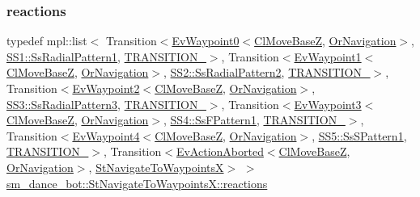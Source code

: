 \subsubsection{\texorpdfstring{reactions}{reactions}}
{\footnotesize\ttfamily typedef mpl\+::list$<$ Transition$<$\hyperlink{structcl__move__base__z_1_1EvWaypoint0}{Ev\+Waypoint0}$<$\hyperlink{classcl__move__base__z_1_1ClMoveBaseZ}{Cl\+Move\+BaseZ}, \hyperlink{classsm__dance__bot_1_1OrNavigation}{Or\+Navigation}$>$, \hyperlink{structsm__dance__bot_1_1SS1_1_1SsRadialPattern1}{S\+S1\+::\+Ss\+Radial\+Pattern1}, \hyperlink{structsm__dance__bot_1_1StNavigateToWaypointsX_1_1TRANSITION__1}{T\+R\+A\+N\+S\+I\+T\+I\+O\+N\+\_}$>$, Transition$<$\hyperlink{structcl__move__base__z_1_1EvWaypoint1}{Ev\+Waypoint1}$<$\hyperlink{classcl__move__base__z_1_1ClMoveBaseZ}{Cl\+Move\+BaseZ}, \hyperlink{classsm__dance__bot_1_1OrNavigation}{Or\+Navigation}$>$, \hyperlink{structsm__dance__bot_1_1SS2_1_1SsRadialPattern2}{S\+S2\+::\+Ss\+Radial\+Pattern2}, \hyperlink{structsm__dance__bot_1_1StNavigateToWaypointsX_1_1TRANSITION__2}{T\+R\+A\+N\+S\+I\+T\+I\+O\+N\+\_}$>$, Transition$<$\hyperlink{structcl__move__base__z_1_1EvWaypoint2}{Ev\+Waypoint2}$<$\hyperlink{classcl__move__base__z_1_1ClMoveBaseZ}{Cl\+Move\+BaseZ}, \hyperlink{classsm__dance__bot_1_1OrNavigation}{Or\+Navigation}$>$, \hyperlink{structsm__dance__bot_1_1SS3_1_1SsRadialPattern3}{S\+S3\+::\+Ss\+Radial\+Pattern3}, \hyperlink{structsm__dance__bot_1_1StNavigateToWaypointsX_1_1TRANSITION__3}{T\+R\+A\+N\+S\+I\+T\+I\+O\+N\+\_}$>$, Transition$<$\hyperlink{structcl__move__base__z_1_1EvWaypoint3}{Ev\+Waypoint3}$<$\hyperlink{classcl__move__base__z_1_1ClMoveBaseZ}{Cl\+Move\+BaseZ}, \hyperlink{classsm__dance__bot_1_1OrNavigation}{Or\+Navigation}$>$, \hyperlink{structsm__dance__bot_1_1SS4_1_1SsFPattern1}{S\+S4\+::\+Ss\+F\+Pattern1}, \hyperlink{structsm__dance__bot_1_1StNavigateToWaypointsX_1_1TRANSITION__4}{T\+R\+A\+N\+S\+I\+T\+I\+O\+N\+\_}$>$, Transition$<$\hyperlink{structcl__move__base__z_1_1EvWaypoint4}{Ev\+Waypoint4}$<$\hyperlink{classcl__move__base__z_1_1ClMoveBaseZ}{Cl\+Move\+BaseZ}, \hyperlink{classsm__dance__bot_1_1OrNavigation}{Or\+Navigation}$>$, \hyperlink{structsm__dance__bot_1_1SS5_1_1SsSPattern1}{S\+S5\+::\+Ss\+S\+Pattern1}, \hyperlink{structsm__dance__bot_1_1StNavigateToWaypointsX_1_1TRANSITION__5}{T\+R\+A\+N\+S\+I\+T\+I\+O\+N\+\_}$>$, Transition$<$\hyperlink{structsmacc_1_1default__events_1_1EvActionAborted}{Ev\+Action\+Aborted}$<$\hyperlink{classcl__move__base__z_1_1ClMoveBaseZ}{Cl\+Move\+BaseZ}, \hyperlink{classsm__dance__bot_1_1OrNavigation}{Or\+Navigation}$>$, \hyperlink{structsm__dance__bot_1_1StNavigateToWaypointsX}{St\+Navigate\+To\+WaypointsX}$>$ $>$ \hyperlink{structsm__dance__bot_1_1StNavigateToWaypointsX_ad7294023661dc53d660fd84d8ed08ca6}{sm\+\_\+dance\+\_\+bot\+::\+St\+Navigate\+To\+Waypoints\+X\+::reactions}}



